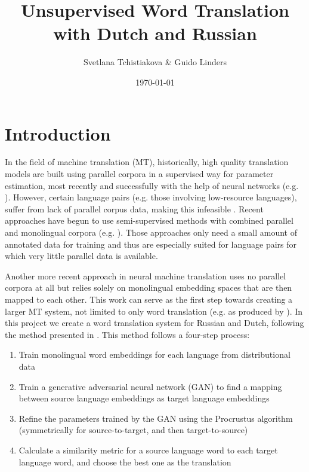 \documentclass{article}
\title{Unsupervised Word Translation with Dutch and Russian}
\author{Svetlana Tchistiakova \& Guido Linders}
\date{\today}
\begin{document}
\maketitle
\section*{Introduction}
In the field of machine translation (MT), historically, high quality translation models are built using parallel corpora in a supervised way for parameter estimation, most recently and successfully with the help of neural networks (e.g. \citet{DBLP:journals/corr/WuSCLNMKCGMKSJL16}). However, certain language pairs (e.g. those involving low-resource languages), suffer from lack of parallel corpus data, making this infeasible \citep{nmt2017oestling}. Recent approaches have begun to use semi-supervised methods with combined parallel and monolingual corpora (e.g. \citet{DBLP:journals/corr/ChengXHHWSL16}). Those approaches only need a small amount of annotated data for training and thus are especially suited for language pairs for which very little parallel data is available.


Another more recent approach in neural machine translation uses no parallel corpora at all but relies solely on monolingual embedding spaces that are then mapped to each other. This work can serve as the first step towards creating a larger MT system, not limited to only word translation (e.g. as produced by \citet{lample2017unsupervised}). In this project we create a word translation system for Russian and Dutch, following the method presented in \citet{conneau2017word}. This method follows a four-step process:

\begin{enumerate}
\item{Train monolingual word embeddings for each language from distributional data}
\item{Train a generative adversarial neural network (GAN) to find a mapping between source language embeddings as target language embeddings}
\item{Refine the parameters trained by the GAN using the Procrustus algorithm (symmetrically for source-to-target, and then target-to-source)}
\item{Calculate a similarity metric for a source language word to each target language word, and choose the best one as the translation}
\end{enumerate}
\end{document}
